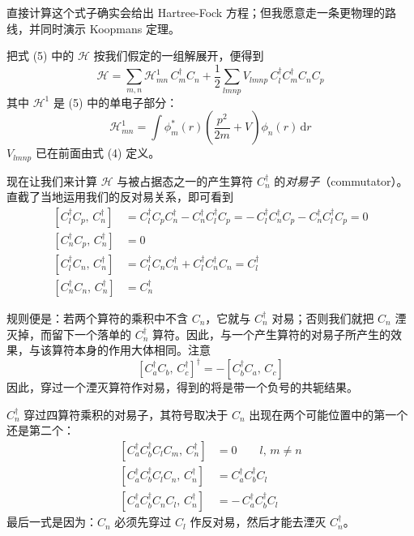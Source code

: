 直接计算这个式子确实会给出 Hartree-Fock 方程；但我愿意走一条更物理的路线，并同时演示 Koopmans 定理。

把式 (5) 中的 $\mathcal{H}$ 按我们假定的一组解展开，便得到
\begin{equation*}
\mathcal{H} = \sum_{m,n} \mathcal{H}^1_{mn}\, C_m^{\dagger} C_n + \frac{1}{2}\sum_{lmnp} V_{lmnp}\, C_l^{\dagger} C_m^{\dagger} C_n C_p
\end{equation*}
其中 $\mathcal{H}^1$ 是 (5) 中的单电子部分：
\begin{equation*}
\mathcal{H}^1_{mn} = \int \phi_m^{*}(r)\left(\frac{p^2}{2m} + V\right)\phi_n(r)\,\mathrm{d}r
\end{equation*}
$V_{lmnp}$ 已在前面由式 (4) 定义。

现在让我们来计算 $\mathcal{H}$ 与被占据态之一的产生算符 $C_n^{\dagger}$ 的\emph{对易子}（commutator）。直截了当地运用我们的反对易关系，即可看到
\begin{align*}
\left[C_l^{\dagger} C_p,\, C_n^{\dagger}\right] &= C_l^{\dagger} C_p C_n^{\dagger} - C_n^{\dagger} C_l^{\dagger} C_p = -\,C_l^{\dagger} C_n^{\dagger} C_p - C_n^{\dagger} C_l^{\dagger} C_p = 0\\
\left[C_n^{\dagger} C_p,\, C_n^{\dagger}\right] &= 0\\
\left[C_l^{\dagger} C_n,\, C_n^{\dagger}\right] &= C_l^{\dagger} C_n C_n^{\dagger} + C_l^{\dagger} C_n^{\dagger} C_n = C_l^{\dagger}\\
\left[C_n^{\dagger} C_n,\, C_n^{\dagger}\right] &= C_n^{\dagger}
\end{align*}

规则便是：若两个算符的乘积中不含 $C_n$，它就与 $C_n^{\dagger}$ 对易；否则我们就把 $C_n$ 湮灭掉，而留下一个落单的 $C_n^{\dagger}$ 算符。因此，与一个产生算符的对易子所产生的效果，与该算符本身的作用大体相同。注意
\begin{equation*}
\left[C_a^{\dagger} C_b,\, C_c^{\dagger}\right]^{\dagger} = -\left[C_b^{\dagger} C_a,\, C_c\right]
\end{equation*}
因此，穿过一个湮灭算符作对易，得到的将是带一个负号的共轭结果。

$C_n^{\dagger}$ 穿过四算符乘积的对易子，其符号取决于 $C_n$ 出现在两个可能位置中的第一个还是第二个：
\begin{align*}
\left[C_a^{\dagger} C_b^{\dagger} C_l C_m,\, C_n^{\dagger}\right] &= 0\qquad l,\, m \neq n\\
\left[C_a^{\dagger} C_b^{\dagger} C_l C_n,\, C_n^{\dagger}\right] &= C_a^{\dagger} C_b^{\dagger} C_l\\
\left[C_a^{\dagger} C_b^{\dagger} C_n C_l,\, C_n^{\dagger}\right] &= -\,C_a^{\dagger} C_b^{\dagger} C_l
\end{align*}
最后一式是因为：$C_n$ 必须先穿过 $C_l$ 作反对易，然后才能去湮灭 $C_n^{\dagger}$。

